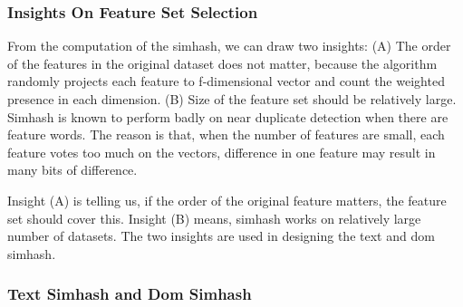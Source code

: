 \subsubsection{Insights On Feature Set Selection}
From the computation of the simhash, we can draw two insights:
(A) The order of the features in the original dataset does not matter, because
the algorithm randomly projects each feature to f-dimensional vector and count
the weighted presence in each dimension.
(B) Size of the feature set should be relatively large. Simhash is known to
perform badly on near duplicate detection when there are feature words. The
reason is that, when the number of features are small, each feature votes too
much on the vectors, difference in one feature may result in many bits of
difference.

Insight (A) is telling us, if the order of the original feature matters, the feature
set should cover this. Insight (B) means, simhash works on relatively large
number of datasets. The two insights are used in designing the text and dom
simhash.

\subsubsection{Text Simhash and Dom Simhash}


%
%
%
%
%
%
%

